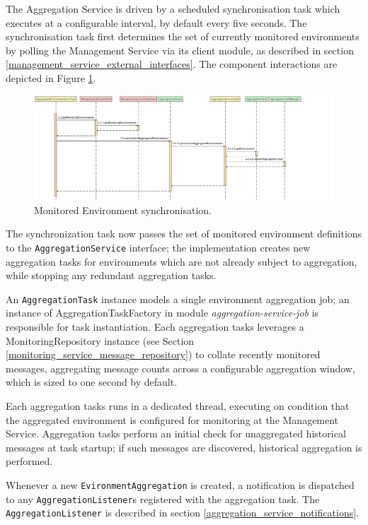 The Aggregation Service is driven by a scheduled synchronisation task which executes at a configurable interval, by default every five seconds. The synchronisation task first determines the set of currently monitored environments by polling the Management Service via its client module, as described in section \ref{management_service_external_interfaces}. The component interactions are depicted in Figure \ref{aggregation_sync_task_sequence}.

\begin{figure}[H]
	\centering  
	\includegraphics[width=\linewidth]{figures/impl/aggregation/sync_task_seq.png}
	\caption{Monitored Environment synchronisation.}
	\label{aggregation_sync_task_sequence}
\end{figure}

The synchronization task now passes the set of monitored environment definitions to the \texttt{AggregationService} interface; the implementation creates new aggregation tasks for environments which are not already subject to aggregation, while stopping any redundant aggregation tasks.

An \texttt{AggregationTask} instance models a single environment aggregation job; an instance of AggregationTaskFactory in module \textit{aggregation-service-job} is responsible for task instantiation. Each aggregation tasks leverages a MonitoringRepository instance (see Section \ref{monitoring_service_message_repository}) to collate recently monitored messages, aggregating message counts across a configurable aggregation window, which is sized to one second by default.

Each aggregation tasks runs in a dedicated thread, executing on condition that the aggregated environment is configured for monitoring at the Management Service. Aggregation tasks perform an initial check for unaggregated historical messages at task startup; if such messages are discovered, historical aggregation is performed. 

Whenever a new \texttt{EvironmentAggregation} is created, a notification is dispatched to any \texttt{AggregationListener}s registered with the aggregation task. The  \texttt{AggregationListener} is described in section \ref{aggregation_service_notifications}.

